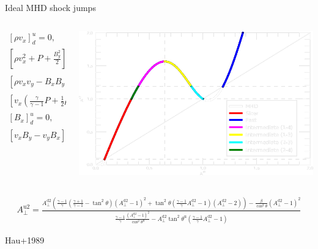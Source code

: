 \documentclass[10pt,aspectratio=169,usenames,dvipsnames]{beamer}
\begin{document}
\begin{frame}{Ideal MHD shock jumps}
\begin{columns}
\begin{column}{0.45\textwidth}
\begin{gather}
    \left[\rho v_x  \right]^u _d = 0,  \\
    \left[\rho v_x^2 +P +\frac{B_y^2}{2} \right]^u _d = 0, \\
    \left[\rho v_x v_y -B_x B_y \right]^u _d = 0, \\
    \left[ v_{x} \left( \frac{\gamma}{\gamma -1} P + \frac{1}{2} \rho v^2 \right) \right]^u _d =0, \\
    \left[B_x \right]^u _d = 0, \\
    \left[v_x B_y -v_y B_x   \right]^u _d = 0, 
\end{gather}
\end{column}
\begin{column}{0.55\textwidth}
\includegraphics[width=0.95\linewidth]{2023NAM/Figures/shockjumps_0.125pi.png}
\end{column}
\end{columns}
\begin{gather}
    A_\perp ^{\text{u}2} = \frac{ A_\perp ^{\text{d}2} \left( \frac{\gamma-1}{\gamma} \left( \frac{\gamma+1}{\gamma -1} -\tan ^2 \theta \right) \left(A_\perp ^{\text{d}2} -1 \right) ^2 + \tan ^2 \theta  \left( \frac{\gamma-1}{\gamma} A_\perp ^{\text{d}2} -1 \right) \left(A_\perp ^{\text{d}2} -2 \right) \right) - \frac{\beta }{ \cos ^2 \theta } \left( A_\perp ^{\text{d}2} -1 \right) ^2 } { \frac{\gamma -1}{\gamma} \frac{\left( A_\perp ^{\text{d}2}-1 \right) ^2}{ \cos ^2 \theta ^{\text{u}}} - A_ \perp ^{\text{d}2} \tan ^2 \theta ^{\text{u}} \left( \frac{\gamma -1}{\gamma} A_\perp ^{\text{d}2} -1 \right) } \label{eqn:hau}
\end{gather}
\begin{flushright}
{\small Hau+1989}
\end{flushright}
\end{frame}
\end{document}
